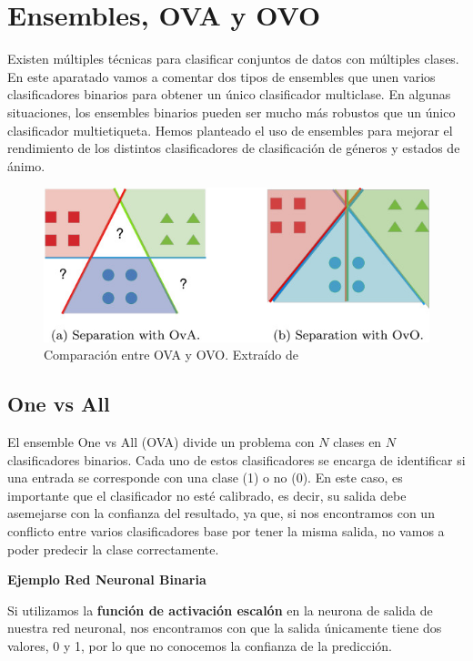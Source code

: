 \hypertarget{ensembles-ova-y-ovo}{%
\section{Ensembles, OVA y OVO}\label{ensembles-ova-y-ovo}}

Existen múltiples técnicas para clasificar conjuntos de datos con múltiples
clases. En este aparatado vamos a comentar dos tipos de ensembles que
unen varios clasificadores binarios para obtener un único clasificador
multiclase.
En algunas situaciones, los ensembles binarios pueden ser mucho más robustos que un único clasificador multietiqueta. 
Hemos planteado el uso de ensembles para mejorar el rendimiento de los distintos clasificadores de clasificación de géneros y estados de ánimo.

\begin{figure}[h]
    \centering
    \includegraphics[]{img/3/ova-ovo.jpg}
    \caption{Comparación entre OVA y OVO. Extraído de \cite{OVA_vs_OVO}}
    \label{fig:ova-ovo}
\end{figure}


\hypertarget{one-vs-all}{%
\subsection{One vs All}\label{one-vs-all}}

El ensemble One vs All (OVA) divide un problema con $N$ clases en $N$
clasificadores binarios. Cada uno de estos clasificadores se encarga de
identificar si una entrada se corresponde con una clase (1) o no (0). En
este caso, es importante que el clasificador no esté calibrado, es decir,
su salida debe asemejarse con la confianza del resultado, ya que, si nos
encontramos con un conflicto entre varios clasificadores base por tener
la misma salida, no vamos a poder predecir la clase correctamente.

\textbf{Ejemplo Red Neuronal Binaria}

Si utilizamos la \textbf{función de activación escalón} en la neurona de
salida de nuestra red neuronal, nos encontramos con que la salida
únicamente tiene dos valores, 0 y 1, por lo que no conocemos la
confianza de la predicción.

